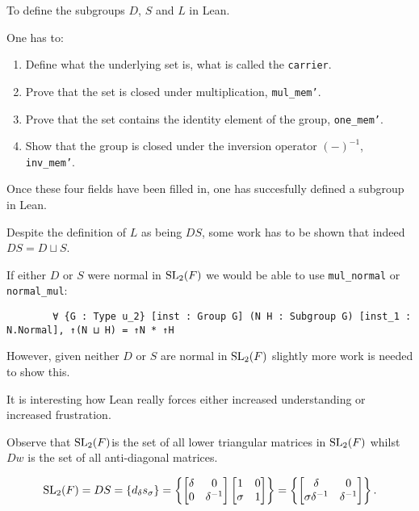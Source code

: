 \begin{remark}
    To define the subgroups $D$, $S$ and $L$ in Lean. 
    
    One has to:
    
    \begin{enumerate}
        \item Define what the underlying set is, what is called the \texttt{carrier}.
        \item Prove that the set is closed under multiplication, \texttt{mul_mem'}.
        \item Prove that the set contains the identity element of the group, \texttt{one_mem'}.
        \item Show that the group is closed under the inversion operator $(-)^{-1}$, \texttt{inv_mem'}.
    \end{enumerate}

    Once these four fields have been filled in, one has succesfully defined a subgroup in Lean.
\end{remark}


\begin{remark}
    Despite the definition of $L$ as being $D S$, some work has to be shown that indeed $DS = D \sqcup S$.
    
    If either $D$ or $S$ were normal in $\operatorname{SL}_2(F)$ we would be able to use \texttt{mul_normal} or \texttt{normal_mul}:
    
    \begin{verbatim}
        ∀ {G : Type u_2} [inst : Group G] (N H : Subgroup G) [inst_1 : N.Normal], ↑(N ⊔ H) = ↑N * ↑H
    \end{verbatim}

    However, given neither $D$ or $S$ are normal in $\operatorname{SL}_2(F)$ slightly more work is needed to show this.
    
    It is interesting how Lean really forces either increased understanding or increased frustration.
\end{remark}

Observe that $\operatorname{SL}_2(F)$is the set of all lower triangular matrices in $\operatorname{SL}_2(F)$ whilst $Dw$ is the set of all anti-diagonal matrices.

\begin{equation} \label{Hlowertri} \operatorname{SL}_2(F)= DS =  \{d_\delta s_\sigma\} = \left\{ \begin{bmatrix} \delta & 0 \\ 0 & \delta^{-1} \end{bmatrix} \begin{bmatrix} 1 & 0 \\ \sigma & 1 \end{bmatrix} \right\} = \left\{ \begin{bmatrix} \delta & 0 \\ \sigma \delta^{-1} & \delta^{-1} \end{bmatrix}  \right\}. \end{equation}

